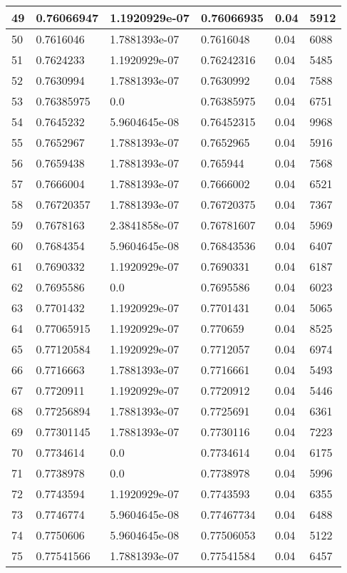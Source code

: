 \begin{longtable}{|l|l|l|l|l|l|}
49 & 0.76066947 & 1.1920929e-07 & 0.76066935 & 0.04 & 5912 \\ \hline 
50 & 0.7616046 & 1.7881393e-07 & 0.7616048 & 0.04 & 6088 \\ \hline 
51 & 0.7624233 & 1.1920929e-07 & 0.76242316 & 0.04 & 5485 \\ \hline 
52 & 0.7630994 & 1.7881393e-07 & 0.7630992 & 0.04 & 7588 \\ \hline 
53 & 0.76385975 & 0.0 & 0.76385975 & 0.04 & 6751 \\ \hline 
54 & 0.7645232 & 5.9604645e-08 & 0.76452315 & 0.04 & 9968 \\ \hline 
55 & 0.7652967 & 1.7881393e-07 & 0.7652965 & 0.04 & 5916 \\ \hline 
56 & 0.7659438 & 1.7881393e-07 & 0.765944 & 0.04 & 7568 \\ \hline 
57 & 0.7666004 & 1.7881393e-07 & 0.7666002 & 0.04 & 6521 \\ \hline 
58 & 0.76720357 & 1.7881393e-07 & 0.76720375 & 0.04 & 7367 \\ \hline 
59 & 0.7678163 & 2.3841858e-07 & 0.76781607 & 0.04 & 5969 \\ \hline 
60 & 0.7684354 & 5.9604645e-08 & 0.76843536 & 0.04 & 6407 \\ \hline 
61 & 0.7690332 & 1.1920929e-07 & 0.7690331 & 0.04 & 6187 \\ \hline 
62 & 0.7695586 & 0.0 & 0.7695586 & 0.04 & 6023 \\ \hline 
63 & 0.7701432 & 1.1920929e-07 & 0.7701431 & 0.04 & 5065 \\ \hline 
64 & 0.77065915 & 1.1920929e-07 & 0.770659 & 0.04 & 8525 \\ \hline 
65 & 0.77120584 & 1.1920929e-07 & 0.7712057 & 0.04 & 6974 \\ \hline 
66 & 0.7716663 & 1.7881393e-07 & 0.7716661 & 0.04 & 5493 \\ \hline 
67 & 0.7720911 & 1.1920929e-07 & 0.7720912 & 0.04 & 5446 \\ \hline 
68 & 0.77256894 & 1.7881393e-07 & 0.7725691 & 0.04 & 6361 \\ \hline 
69 & 0.77301145 & 1.7881393e-07 & 0.7730116 & 0.04 & 7223 \\ \hline 
70 & 0.7734614 & 0.0 & 0.7734614 & 0.04 & 6175 \\ \hline 
71 & 0.7738978 & 0.0 & 0.7738978 & 0.04 & 5996 \\ \hline 
72 & 0.7743594 & 1.1920929e-07 & 0.7743593 & 0.04 & 6355 \\ \hline 
73 & 0.7746774 & 5.9604645e-08 & 0.77467734 & 0.04 & 6488 \\ \hline 
74 & 0.7750606 & 5.9604645e-08 & 0.77506053 & 0.04 & 5122 \\ \hline 
75 & 0.77541566 & 1.7881393e-07 & 0.77541584 & 0.04 & 6457 \\ \hline 
\end{longtable}